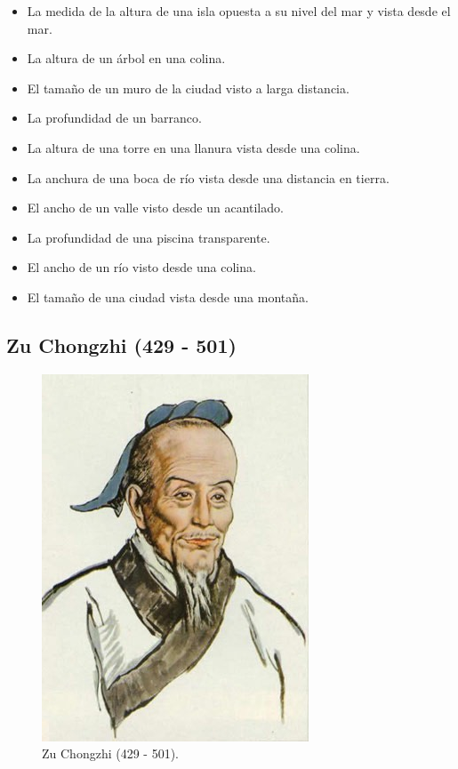 \documentclass[a4paper, 11pt]{article}
\begin{document}
		\begin{itemize}
			\item La medida de la altura de una isla opuesta a su nivel del mar y vista desde el mar.
			\item La altura de un árbol en una colina.
			\item El tamaño de un muro de la ciudad visto a larga distancia.
			\item La profundidad de un barranco.
			\item La altura de una torre en una llanura vista desde una colina.
			\item La anchura de una boca de río vista desde una distancia en tierra.
			\item El ancho de un valle visto desde un acantilado.
			\item La profundidad de una piscina transparente.
			\item El ancho de un río visto desde una colina.
			\item El tamaño de una ciudad vista desde una montaña.
		\end{itemize}

	\subsection{Zu Chongzhi (429 - 501)}
		\begin{figure}[!ht]
			\centering
			\includegraphics{zu_chongzhi.jpg}
			\caption{Zu Chongzhi (429 - 501).}
			\label{fig:zu_chongzhi}
		\end{figure}
\end{document}
